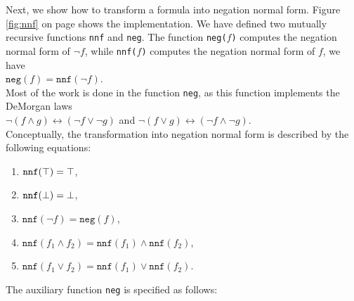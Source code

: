 Next, we show how to transform a formula into negation normal form.
Figure \ref{fig:nnf} on page \pageref{fig:nnf} shows the implementation.
We have defined two mutually recursive functions  \texttt{nnf} and
\texttt{neg}.  The function \texttt{neg($f$)}
computes the negation normal form of  $\neg f$, while  \texttt{nnf($f$)} computes the negation
normal form of $f$, we have
\\[0.2cm]
\hspace*{1.3cm}
$\mathtt{neg}(f) = \mathtt{nnf}(\neg f)$.
\\[0.2cm]
Most of the work is done in the function \texttt{neg}, as this function implements the DeMorgan laws 
\\[0.2cm]
\hspace*{1.3cm} $\neg (f \wedge g) \leftrightarrow (\neg f \vee \neg g)$ \quad and \quad $\neg (f
\vee g) \leftrightarrow (\neg f \wedge \neg g)$.
 \\[0.2cm]
Conceptually, the transformation into negation normal form is described by the following equations:
\begin{enumerate}
\item $\texttt{nnf}(\top) = \top$,
\item $\texttt{nnf}(\bot) = \bot$,
\item $\texttt{nnf}(\neg f) = \mathtt{neg}(f)$,
\item $\texttt{nnf}(f_1 \wedge f_2) = \mathtt{nnf}(f_1) \wedge \mathtt{nnf}(f_2)$,
\item $\texttt{nnf}(f_1 \vee f_2) = \mathtt{nnf}(f_1) \vee \mathtt{nnf}(f_2)$.
\end{enumerate}
The auxiliary function \texttt{neg} is specified as follows:
